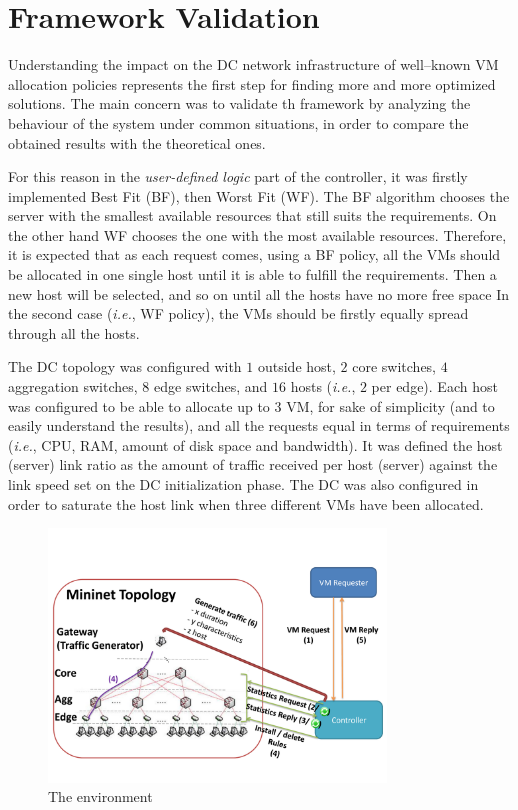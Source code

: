 \documentclass[12pt,english,oneside]{book}
\begin{document}
\section{Framework Validation}

Understanding the impact on the DC network infrastructure of well--known VM allocation policies represents the first step for finding more and more optimized solutions. The main concern was to validate th framework by analyzing the behaviour of the system under common situations, in order to compare the obtained results with the theoretical ones.

For this reason in the \textit{user-defined logic} part of the controller, it was firstly implemented Best Fit (BF), then Worst Fit (WF).
The BF algorithm chooses the server with the smallest available resources that still suits the requirements.
On the other hand WF chooses the one with the most available resources.
Therefore, it is expected that as each request comes, using a BF policy, all the VMs should be allocated in one single host until it is able to fulfill the requirements.
Then a new host will be selected, and so on until all the hosts have no more free space
 In the second case (\textit{i.e.}, WF policy), the VMs should be firstly equally spread through all 
the hosts.

The DC topology was configured with $1$ outside host, $2$ core switches, $4$ aggregation switches, $8$ edge switches, and $16$ hosts (\textit{i.e.}, $2$ per edge). Each host was configured to be able to allocate up to $3$ VM, for sake of simplicity (and to easily understand the results), and all the requests equal in terms of requirements (\textit{i.e.}, CPU, RAM, amount of disk space and bandwidth). It was defined the host (server) link ratio as the amount of traffic received per host (server) against the link speed set on the DC initialization phase. The DC was also configured in order to saturate the host link when three different VMs have been allocated.

\begin{figure}[h!tbp]
        \centering
        \includegraphics[width=0.8\textwidth]{figures/figure1.pdf}
        \caption{The environment}
        \label{fig:use_case}
\end{figure}
\end{document}
